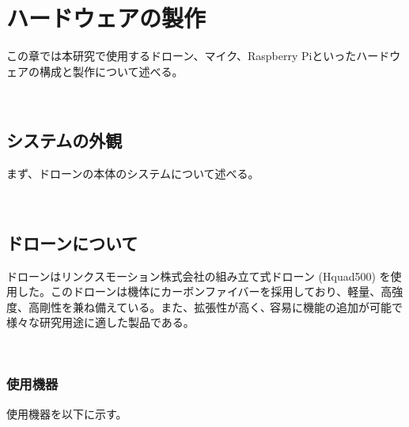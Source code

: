 \chapter{ハードウェアの製作}\label{hardware}

この章では本研究で使用するドローン、マイク、Raspberry
Piといったハードウェアの構成と製作について述べる。

\
\section{システムの外観}\label{system-overview}

まず、ドローンの本体のシステムについて述べる。

\
\section{ドローンについて}\label{about-drone}

ドローンはリンクスモーション株式会社の組み立て式ドローン (Hquad500)
を使用した。このドローンは機体にカーボンファイバーを採用しており、軽量、高強度、高剛性を兼ね備えている。また、拡張性が高く､
容易に機能の追加が可能で様々な研究用途に適した製品である。

\
\subsection{使用機器}\label{used-equipments-drone}

使用機器を以下に示す。

